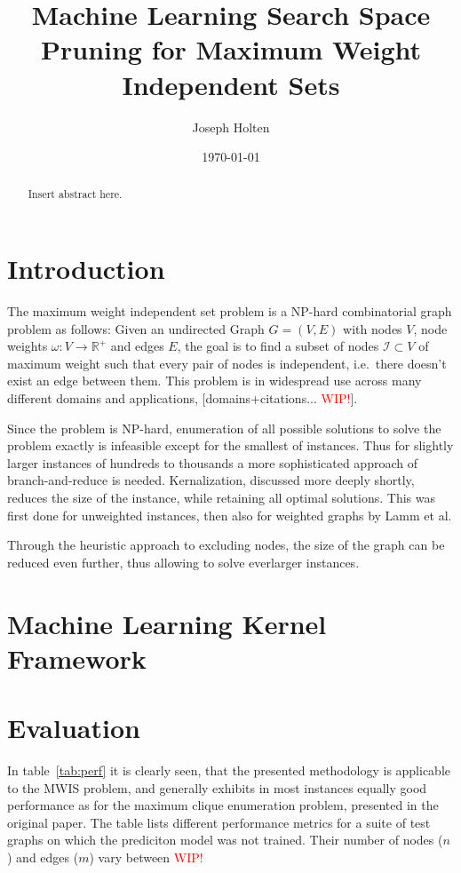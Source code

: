 \documentclass[acmsmall,nonacm,screen,review]{acmart}
\title{Machine Learning Search Space Pruning for Maximum Weight Independent Sets}
\author{Joseph Holten}
\affiliation{%
  \institution{Heidelberg University}
  \streetaddress{Im Neuenheimer Feld 205}
  \city{Heidelberg}
  \state{Baden-Württemberg}
  \country{Germany}
  \postcode{69120}
}
\date{\today}
\newcommand{\R}{\mathbb{R}}
\newcommand{\wip}{\textcolor{red}{WIP!}}
\begin{document}
\begin{abstract}
Insert abstract here.
\end{abstract}
\maketitle

\section{Introduction}
The maximum weight independent set problem is a NP-hard \cite{christian-exact-mwis} combinatorial graph problem as follows:
Given an undirected Graph $G=(V, E)$ with nodes $V$, node weights $\omega : V \rightarrow \R^+$ and edges $E$, 
the goal is to find a subset of nodes $\mathcal{I} \subset V$ of maximum weight such that every pair of nodes is independent,
i.e.\ there doesn't exist an edge between them. This problem is in widespread use across many different domains and applications, [domains+citations... \wip].

Since the problem is NP-hard, enumeration of all possible solutions to solve the problem exactly is infeasible except for the smallest of instances.
Thus for slightly larger instances of hundreds to thousands a more sophisticated approach of branch-and-reduce is needed. 
Kernalization, discussed more deeply shortly, reduces the size of the instance, while retaining all optimal solutions.
This was first done for unweighted instances, then also for weighted graphs by Lamm et al.

Through the heuristic approach to excluding nodes, the size of the graph can be reduced even further, thus allowing to solve everlarger instances.

\section{Machine Learning Kernel Framework}

\section{Evaluation}
In table~\ref{tab:perf} it is clearly seen, that the presented methodology is applicable to the MWIS problem,
and generally exhibits in most instances equally good performance as for the maximum clique enumeration problem,
presented in the original paper. 
The table lists different performance metrics for a suite of test graphs on which the prediciton model was not trained.
Their number of nodes ($n$) and edges ($m$) vary between \wip 
\end{document}
